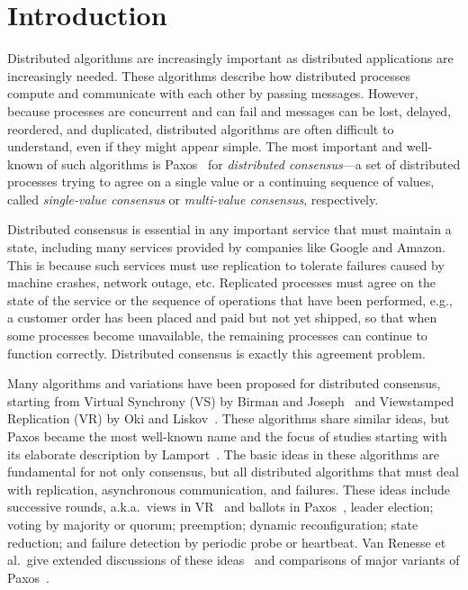 \documentclass[11pt]{article}
\newcommand{\defn}[1]{\textit{#1}} %
\newcommand{\mysec}[1]{\section{#1}}
\begin{document}
\mysec{Introduction}
\label{sec-intro}

Distributed algorithms are increasingly important as distributed
applications are increasingly needed.  These algorithms describe how
distributed processes compute and communicate with each other by passing
messages. %
However, because processes are concurrent and can fail and messages can be
lost, delayed, reordered, and duplicated, distributed algorithms are often
difficult to understand, even if they might appear simple.
The most important and well-known of such algorithms is
Paxos~\cite{Lam98paxos,lam01paxos,vra15paxos} for \defn{distributed
  consensus}---a set of distributed processes trying to agree on a single
value or a continuing sequence of values, called \defn{single-value
  consensus} or \defn{multi-value consensus}, respectively.

Distributed consensus is essential in any important service that must
maintain a state, %
including many services provided by companies like Google and Amazon.  This
is because such services must use replication to tolerate failures caused
by machine crashes, network outage, etc. %
Replicated processes must agree on the state of the service or the sequence
of operations that have been performed, e.g., a customer order has been
placed and paid but not yet shipped, so that when some processes become
unavailable, the remaining processes can continue to function correctly.
Distributed consensus is exactly this agreement problem.

Many algorithms and variations have been proposed for distributed
consensus, starting from Virtual Synchrony (VS) by Birman and
Joseph~\cite{birman1987reliable} and Viewstamped Replication (VR) by Oki
and Liskov~\cite{oki88vsr}.  These algorithms share similar ideas, but
Paxos became the most well-known name and the focus of studies 
starting with its elaborate description by
Lamport~\cite{Lam98paxos,lam-paxos-history}.
The basic ideas %
in these algorithms are fundamental for not only
consensus, but all distributed algorithms that must deal with replication,
asynchronous communication, and failures.  These ideas include successive
rounds, a.k.a.\ views in VR~\cite{oki88vsr} and ballots in
Paxos~\cite{Lam98paxos}, leader election; voting by majority or quorum;
preemption; dynamic reconfiguration; state reduction; and failure detection
by periodic probe or heartbeat.  Van Renesse et al.\ give extended
discussions of these ideas~\cite{vra15paxos} and comparisons of major
variants of Paxos~\cite{van15vive}. %
\end{document}
